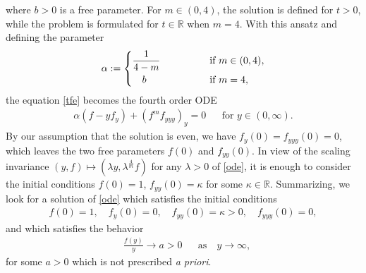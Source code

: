 \documentclass{article}%
\newcommand{\alp}{\alpha}
\newcommand{\lam}{\lambda}
\newcommand{\R}{\mathbb{R}}
\begin{document}
  where $b > 0$ is a free parameter. For $m \in (0,4)$, the solution is defined
  for $t > 0$, while the problem is formulated for $t \in\R$ when 
$m = 4$. With this ansatz and defining the parameter
\begin{equation}\label{alpha:def}
\alpha:=
\begin{cases}
\displaystyle{\frac{1}{4-m}} \qquad\qquad  &\mbox{if } m \in (0,4),  \vspace{0.4ex}\\
\ \ \ b &\mbox{if } m=4, 
\end{cases} 
\end{equation}
the equation \eqref{tfe} becomes the fourth order ODE
\begin{align}\label{ode} 
  \alp \left(f - y f_y \right)+ (f^m f_{yyy})_y = 0 && \text{for $y \in (0,\infty)$.}
\end{align}
By our assumption that the solution is even, we have $f_{y}(0)=f_{yyy}(0)=0$, which leaves 
the two free parameters $f(0)$ and $f_{yy}(0)$. In view of the scaling invariance 
$(y, f) \mapsto (\lam y, \lam^{{\frac 4m}} f)$ for any $\lam > 0$ of
\eqref{ode}, it is enough to consider the initial conditions $f(0)=1$, $f_{yy}(0)=\kappa$ for some 
$\kappa \in \R$. Summarizing, we look for a solution of \eqref{ode} which satisfies the initial conditions
\begin{align}
  f(0)=1,\quad  f_y(0)=0, \quad f_{yy}(0)=\kappa>0, \quad f_{yyy}(0) = 0, \label{init:ss}
\end{align}
and which satisfies the behavior
\begin{align} 
 &\frac{f(y)}{y} \rightarrow a > 0  && \text{as} \quad y\to\infty, \label{LBU}
\end{align}
for some $a > 0$ which is not prescribed {\it a priori}.

\medskip
\end{document}
